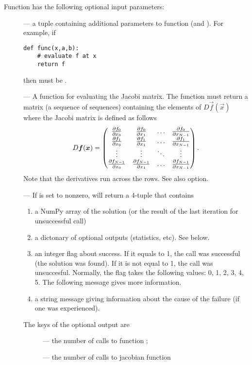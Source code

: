Function  has the following optional input parameters:
\begin{description}
\item[] --- a tuple containing additional parameters to
  function  (and ). For example, if
\begin{verbatim}
def func(x,a,b):
    # evaluate f at x
    return f
\end{verbatim}
  then  must be .
\item[] --- A function for evaluating the Jacobi
  matrix. The function  must return a matrix (a sequence of
  sequences) containing the elements of $D\vec f(\vec x)$ where the
  Jacobi matrix is defined as follows
\begin{displaymath}
D\boldsymbol{f}(\boldsymbol{x})=\begin{pmatrix} 
\frac{\partial{f_0}}{\partial{x_0}}&\frac{\partial{f_0}}{\partial{x_1}} &\ldots&\frac{\partial{f_0}}{\partial{x_{N-1}}}\\
\frac{\partial{f_1}}{\partial{x_0}}&\frac{\partial{f_1}}{\partial{x_1}} &\ldots&\frac{\partial{f_1}}{\partial{x_{N-1}}}\\
\vdots &\vdots&\ddots&\vdots\\
\frac{\partial{f_{N-1}}}{\partial{x_0}}&\frac{\partial{f_{N-1}}}{\partial{x_1}}&\ldots&\frac{\partial{f_{N-1}}}{\partial{x_{N-1}}}
 \end{pmatrix}.
\end{displaymath}
Note that the derivatives run across the rows. See also
 option.
\item[] --- If  is set to
  nonzero,  will return a 4-tuple that contains
  \begin{enumerate}
  \item a NumPy array of the solution (or the result of the last
    iteration for unsuccessful call)
  \item a dictonary of optional outputs (statistics, etc). See below.
  \item an integer flag about  success. If it equals to
    1, the call was successful (the solution was found). If it is not
    equal to 1, the call was unsuccesful. Normally, the flag takes
    the following values: 0, 1, 2, 3, 4, 5. The following message gives
    more information.
  \item a string message giving information about the cause of the
     failure (if one was experienced).
  \end{enumerate}
  The keys of the optional output are
  \begin{description}
  \item[] --- the number of calls to function ;
  \item[] --- the number of calls to jacobian function

\end{description}
\end{description}
